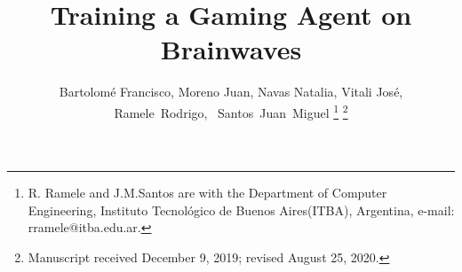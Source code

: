 \documentclass[journal]{IEEEtran}
\providecommand{\DIFaddbegin}{} %
\providecommand{\DIFaddend}{} %
\providecommand{\DIFdelbegin}{} %
\providecommand{\DIFdelend}{} %
\newcommand{\DIFscaledelfig}{0.5}
\newlength{\DIFdelgraphicswidth} %
\newlength{\DIFdelgraphicsheight} %
\newcommand{\DIFaddincludegraphics}[2][]{{\color{blue}\fbox{\DIFOincludegraphics[#1]{#2}}}} %
\newcommand{\DIFdelincludegraphics}[2][]{%
\sbox{\DIFdelgraphicsbox}{\DIFOincludegraphics[#1]{#2}}%
\settoboxwidth{\DIFdelgraphicswidth}{\DIFdelgraphicsbox} %
\settoboxtotalheight{\DIFdelgraphicsheight}{\DIFdelgraphicsbox} %
\scalebox{\DIFscaledelfig}{%
\parbox[b]{\DIFdelgraphicswidth}{\usebox{\DIFdelgraphicsbox}\\[-\baselineskip] \rule{\DIFdelgraphicswidth}{0em}}\llap{\resizebox{\DIFdelgraphicswidth}{\DIFdelgraphicsheight}{%
\setlength{\unitlength}{\DIFdelgraphicswidth}%
\begin{picture}(1,1)%
\thicklines\linethickness{2pt} %
{\color[rgb]{1,0,0}\put(0,0){\framebox(1,1){}}}%
{\color[rgb]{1,0,0}\put(0,0){\line( 1,1){1}}}%
{\color[rgb]{1,0,0}\put(0,1){\line(1,-1){1}}}%
\end{picture}%
}\hspace*{3pt}}} %
} %
\DeclareRobustCommand{\DIFaddbegin}{\DIFOaddbegin \let\includegraphics\DIFaddincludegraphics} %
\DeclareRobustCommand{\DIFaddend}{\DIFOaddend \let\includegraphics\DIFOincludegraphics} %
\DeclareRobustCommand{\DIFdelbegin}{\DIFOdelbegin \let\includegraphics\DIFdelincludegraphics} %
\DeclareRobustCommand{\DIFdelend}{\DIFOaddend \let\includegraphics\DIFOincludegraphics} %
\begin{document}
%
\title{Training a Gaming Agent on Brainwaves}
%
%
%

\author{Bartolomé Francisco, Moreno Juan,  Navas Natalia, Vitali José, \\
Ramele~Rodrigo,~
        Santos~Juan~Miguel%
\thanks{R. Ramele and J.M.Santos are with the Department
of Computer Engineering, Instituto Tecnológico de Buenos Aires(ITBA), Argentina,
e-mail: rramele@itba.edu.ar.}%
\DIFdelbegin %
\DIFdelend \DIFaddbegin \thanks{Manuscript received December 9, 2019; revised August 25, 2020.}\DIFaddend }

%
%
\end{document}
